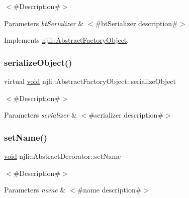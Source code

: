 $<$\#\+Description\#$>$


\begin{DoxyParams}{Parameters}
{\em bt\+Serializer} & $<$\#bt\+Serializer description\#$>$ \\
\hline
\end{DoxyParams}


Implements \mbox{\hyperlink{classnjli_1_1_abstract_factory_object_aad2fbe86fb3bdecf02918a96b9c57976}{njli\+::\+Abstract\+Factory\+Object}}.

\mbox{\label{classnjli_1_1_scene_state_a4fc4bcd9d1930911474210c047372fc0}} 
\subsubsection{\texorpdfstring{serialize\+Object()}{serializeObject()}}
{\footnotesize\ttfamily virtual \mbox{\hyperlink{_thread_8h_af1e856da2e658414cb2456cb6f7ebc66}{void}} njli\+::\+Abstract\+Factory\+Object\+::serialize\+Object}

$<$\#\+Description\#$>$


\begin{DoxyParams}{Parameters}
{\em serializer} & $<$\#serializer description\#$>$ \\
\hline
\end{DoxyParams}
\mbox{\label{classnjli_1_1_scene_state_a087eb5f8d9f51cc476f12f1d10a3cb95}} 
\subsubsection{\texorpdfstring{set\+Name()}{setName()}}
{\footnotesize\ttfamily \mbox{\hyperlink{_thread_8h_af1e856da2e658414cb2456cb6f7ebc66}{void}} njli\+::\+Abstract\+Decorator\+::set\+Name}

$<$\#\+Description\#$>$


\begin{DoxyParams}{Parameters}
{\em name} & $<$\#name description\#$>$ \\
\hline
\end{DoxyParams}
\mbox{\label{classnjli_1_1_scene_state_a68e927da0cdc2b8806fae344b75e3f61}} 
